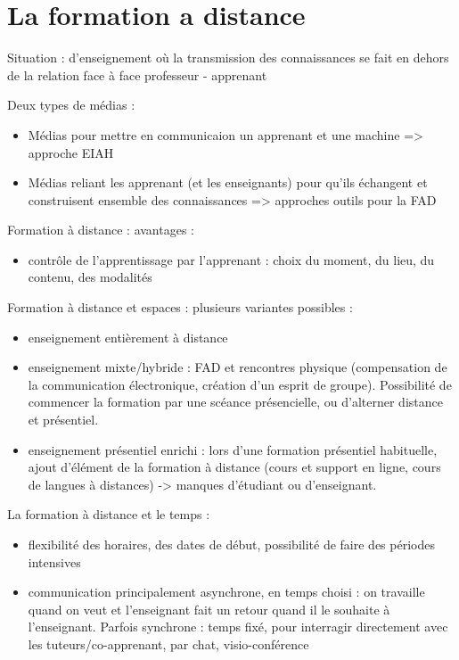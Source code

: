 \documentclass[11pt]{article}
\begin{document}
\section{La formation a distance}
Situation : d'enseignement où la transmission des connaissances se fait en dehors de la relation face à face professeur - apprenant

\vskip 1cm
Deux types de médias :
\begin{itemize}
	\item Médias pour mettre en communicaion un apprenant et une machine => approche EIAH
	\item Médias reliant les apprenant (et les enseignants) pour qu'ils échangent et construisent ensemble des connaissances => approches outils pour la FAD
\end{itemize}

\vskip 1cm

Formation à distance : avantages :
\begin{itemize}
	\item contrôle de l'apprentissage par l'apprenant : choix du moment, du lieu, du contenu, des modalités
\end{itemize}

\vskip 1cm
Formation à distance et espaces : plusieurs variantes possibles :
\begin{itemize}
	\item enseignement entièrement à distance
	\item enseignement mixte/hybride : FAD et rencontres physique (compensation de la communication électronique, création d'un esprit de groupe). Possibilité de commencer la formation par une scéance présencielle, ou d'alterner distance et présentiel.
	\item enseignement présentiel enrichi : lors d'une formation présentiel habituelle, ajout d'élément de la formation à distance (cours et support en ligne, cours de langues à distances) -> manques d'étudiant ou d'enseignant.
\end{itemize}

\vskip 1cm
La formation à distance et le temps :
\begin{itemize}
	\item flexibilité des horaires, des dates de début, possibilité de faire des périodes intensives
	\item communication principalement asynchrone, en temps choisi : on travaille quand on veut et l'enseignant fait un retour quand il le souhaite à l'enseignant. Parfois synchrone : temps fixé, pour interragir directement avec les tuteurs/co-apprenant, par chat, visio-conférence
\end{itemize}
\vskip 1cm
\end{document}
